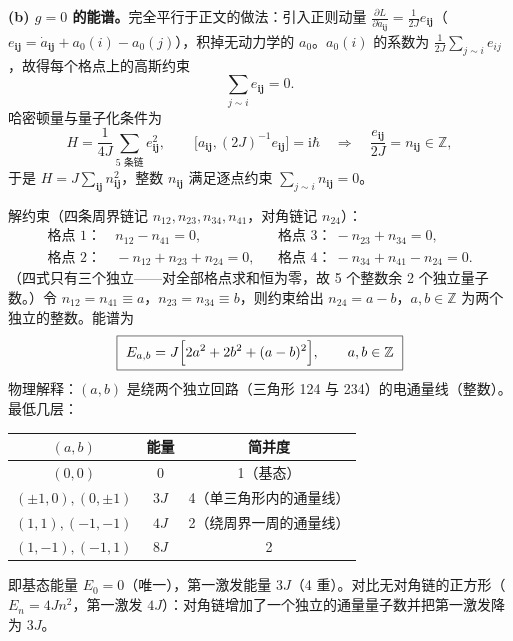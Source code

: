 \textbf{(b) $g=0$ 的能谱。}完全平行于正文的做法：引入正则动量 $\frac{\partial L}{\partial\dot a_{\pmb{ij}}}=\frac{1}{2J}e_{\pmb{ij}}$（$e_{\pmb{ij}}=\dot a_{\pmb{ij}}+a_0(i)-a_0(j)$），积掉无动力学的 $a_0$。$a_0(i)$ 的系数为 $\frac{1}{2J}\sum_{j\sim i}e_{ij}$，故得每个格点上的高斯约束
\begin{equation*}
\sum_{j\sim i}e_{\pmb{ij}}=0 .
\end{equation*}
哈密顿量与量子化条件为
\begin{equation*}
H=\frac{1}{4J}\sum_{\text{5 条链}}e_{\pmb{ij}}^{2},
\qquad
\bigl[a_{\pmb{ij}},(2J)^{-1}e_{\pmb{ij}}\bigr]=\mathrm{i}\hbar
\quad\Longrightarrow\quad
\frac{e_{\pmb{ij}}}{2J}=n_{\pmb{ij}}\in\mathbb{Z},
\end{equation*}
于是 $H=J\sum_{\pmb{ij}}n_{\pmb{ij}}^{2}$，整数 $n_{\pmb{ij}}$ 满足逐点约束 $\sum_{j\sim i}n_{\pmb{ij}}=0$。

解约束（四条周界链记 $n_{12},n_{23},n_{34},n_{41}$，对角链记 $n_{24}$）：
\begin{align*}
\text{格点 1：}&\ n_{12}-n_{41}=0, &&\text{格点 3：}\ -n_{23}+n_{34}=0,\\
\text{格点 2：}&\ -n_{12}+n_{23}+n_{24}=0, &&\text{格点 4：}\ -n_{34}+n_{41}-n_{24}=0 .
\end{align*}
（四式只有三个独立——对全部格点求和恒为零，故 5 个整数余 2 个独立量子数。）令 $n_{12}=n_{41}\equiv a$，$n_{23}=n_{34}\equiv b$，则约束给出 $n_{24}=a-b$，$a,b\in\mathbb{Z}$ 为两个独立的整数。能谱为
\begin{equation*}
\boxed{\ E_{a,b}=J\Bigl[2a^{2}+2b^{2}+(a-b)^{2}\Bigr],\qquad a,b\in\mathbb{Z}\ }
\end{equation*}
物理解释：$(a,b)$ 是绕两个独立回路（三角形 124 与 234）的电通量线（整数）。最低几层：
\begin{center}
\begin{tabular}{ccc}
\toprule
$(a,b)$ & 能量 & 简并度\\
\midrule
$(0,0)$ & $0$ & 1（基态）\\
$(\pm1,0),(0,\pm1)$ & $3J$ & 4（单三角形内的通量线）\\
$(1,1),(-1,-1)$ & $4J$ & 2（绕周界一周的通量线）\\
$(1,-1),(-1,1)$ & $8J$ & 2\\
\bottomrule
\end{tabular}
\end{center}
即基态能量 $E_0=0$（唯一），第一激发能量 $3J$（4 重）。对比无对角链的正方形（$E_n=4Jn^{2}$，第一激发 $4J$）：对角链增加了一个独立的通量量子数并把第一激发降为 $3J$。

